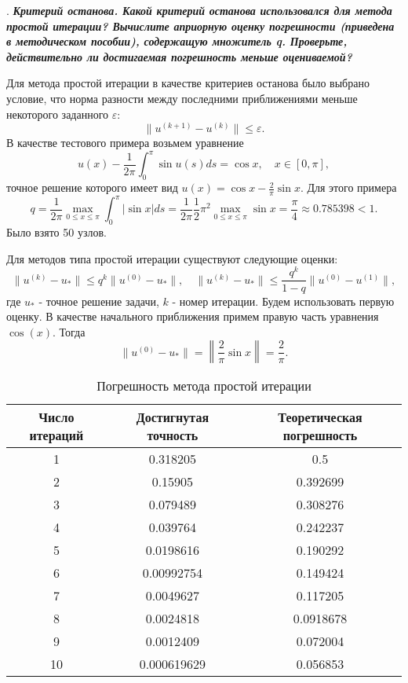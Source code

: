 \documentclass[12pt, a4paper]{article}
\newcounter{mycounter}
\newcommand{\question}[1]{%
	\stepcounter{mycounter}%
	\textbf{\themycounter}.  %
	\textbf{\textit{#1}}
	
}
\begin{document}
	
	\bigskip
	\question{Критерий останова. Какой критерий останова использовался для метода простой итерации? Вычислите априорную оценку погрешности (приведена в методическом пособии), содержащую множитель q. Проверьте, действительно ли достигаемая погрешность меньше оцениваемой?}
		
	Для метода простой итерации в качестве критериев останова было выбрано условие, что норма разности между последними приближениями меньше некоторого заданного $\varepsilon$:
	\[
	\| u^{(k+1)} - u^{(k)} \| \le \varepsilon.
	\]
	В качестве тестового примера возьмем уравнение
	\[
	u(x) - \frac{1}{2\pi} \int_0^\pi \sin u(s) ds = \cos x, \quad x \in [0, \pi],
	\]
	точное решение которого имеет вид $u(x) = \cos x - \frac{2}{\pi} \sin x$. Для этого примера
	\[
	q = \frac{1}{2\pi} \max_{0 \le x \le \pi} \int_0^\pi |\sin x| ds = \frac{1}{2\pi} \frac{1}{2} \pi^2 \max_{0 \le x \le \pi} \sin x = \frac{\pi}{4} \approx 0.785398 < 1.
	\]
	Было взято 50 узлов.
	
	Для методов типа простой итерации существуют следующие оценки:
	\[
	\| u^{(k)} - u_* \| \le q^k \| u^{(0)} - u_* \|, \quad \| u^{(k)} - u_* \| \le \frac{q^k}{1 - q} \| u^{(0)} - u^{(1)} \|,
	\]
	где $u_*$ - точное решение задачи, $k$ - номер итерации. Будем использовать первую оценку. В качестве начального приближения примем правую часть уравнения $\cos(x)$. Тогда
	\[
	\| u^{(0)} - u_* \| = \left\| \frac{2}{\pi} \sin x \right\| = \frac{2}{\pi}.
	\]
	
	\begin{table}[h!]
		\centering
		\caption{Погрешность метода простой итерации}
		\begin{tabular}{|c|c|c|}
			\hline
			Число итераций & Достигнутая точность & Теоретическая погрешность \\
			\hline
			1 & 0.318205 & 0.5 \\
			2 & 0.15905 & 0.392699 \\
			3 & 0.079489 & 0.308276 \\
			4 & 0.039764 & 0.242237 \\
			5 & 0.0198616 & 0.190292 \\
			6 & 0.00992754 & 0.149424 \\
			7 & 0.0049627 & 0.117205 \\
			8 & 0.0024818 & 0.0918678 \\
			9 & 0.0012409 & 0.072004 \\
			10 & 0.000619629 & 0.056853 \\
			\hline
		\end{tabular}
	\end{table}
		
\end{document}
